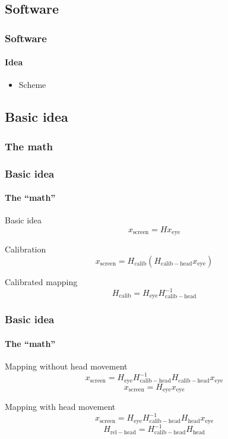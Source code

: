 \documentclass[%
14pt
]{beamer}
\begin{document}
\subsection{Software}
\begin{frame}
	\frametitle{Software}
  \framesubtitle{Idea}
  \begin{itemize}
    \item Scheme
  \end{itemize}
\end{frame}

\subsection{Basic idea}
\subsubsection{The math}
\begin{frame}
	\frametitle{Basic idea}
  \framesubtitle{The ``math''}
  \begin{block}{Basic idea}
    \begin{equation*}
      x_\mathrm{screen} = H x_\mathrm{eye}
    \end{equation*}
  \end{block}\pause
  \begin{block}{Calibration}
    \begin{equation*}
      x_\mathrm{screen} = H_\mathrm{calib} (H_\mathrm{calib-head} x_\mathrm{eye})
    \end{equation*}
  \end{block}\pause
  \begin{block}{Calibrated mapping}
    \begin{equation*}
      H_\mathrm{calib} = H_\mathrm{eye} H_\mathrm{calib-head} ^{-1}
    \end{equation*}
  \end{block}
\end{frame}

\begin{frame}
	\frametitle{Basic idea}
  \framesubtitle{The ``math''}
  \begin{block}{Mapping without head movement}
    \begin{equation*}
      x_\mathrm{screen} = H_\mathrm{eye} H_\mathrm{calib-head} ^{-1} H_\mathrm{calib-head} x_\mathrm{eye}
    \end{equation*}
    \begin{equation*}
      x_\mathrm{screen} = H_\mathrm{eye}  x_\mathrm{eye}
    \end{equation*}
  \end{block}\pause
  \begin{block}{Mapping with head movement}
    \begin{equation*}
      x_\mathrm{screen} = H_\mathrm{eye} H_\mathrm{calib-head} ^{-1} H_\mathrm{head} x_\mathrm{eye}
    \end{equation*}
    \begin{equation*}
      H_\mathrm{rel-head} = H_\mathrm{calib-head}^{-1} H_\mathrm{head}
    \end{equation*}
  \end{block}
\end{frame}
\end{document}
